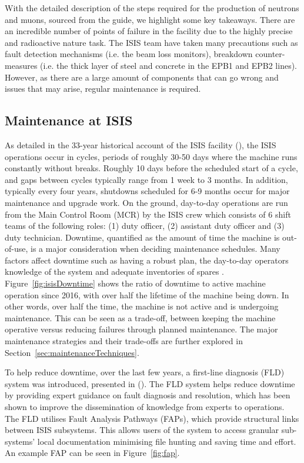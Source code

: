 \documentclass[10pt,oneside]{report}
\begin{document}
\noindent With the detailed description of the steps required for the production of neutrons and muons, sourced from the guide, we highlight some key takeaways. There are an incredible number of points of failure in the facility due to the highly precise and radioactive nature task. The ISIS team have taken many precautions such as fault detection mechanisms (i.e. the beam loss monitors), breakdown counter-measures (i.e. the thick layer of steel and concrete in the EPB1 and EPB2 lines). However, as there are a large amount of components that can go wrong and issues that may arise, regular maintenance is required. 

\subsection{Maintenance at ISIS} 
As detailed in the 33-year historical account of the ISIS facility (\citet{thomason2019isis}), the ISIS operations occur in cycles, periods of roughly 30-50 days where the machine runs constantly without breaks. Roughly 10 days before the scheduled start of a cycle, and gaps between cycles typically range from 1 week to 3 months. In addition, typically every four years, shutdowns scheduled for 6-9 months occur for major maintenance and upgrade work. On the ground, day-to-day operations are run from the Main Control Room (MCR) by the ISIS crew which consists of 6 shift teams of the following roles: (1) duty officer, (2) assistant duty officer and (3) duty technician.  Downtime, quantified as the amount of time the machine is out-of-use, is a major consideration when deciding maintenance schedules. Many factors affect downtime such as having a robust plan, the day-to-day operators knowledge of the system and adequate inventories of spares \cite{thomason2019isis}. Figure~\ref{fig:isisDowntime} shows the ratio of downtime to active machine operation since 2016, with over half the lifetime of the machine being down. In other words, over half the time, the machine is not active and is undergoing maintenance. This can be seen as a trade-off, between keeping the machine operative versus reducing failures through planned maintenance. The major maintenance strategies and their trade-offs are further explored in Section~\ref{sec:maintenanceTechniques}.

To help reduce downtime, over the last few years, a first-line diagnosis (FLD) system was introduced, presented in (\citet{fld2017}). The FLD system helps reduce downtime by providing expert guidance on fault diagnosis and resolution, which has been shown to improve the dissemination of knowledge from experts to operations. The FLD utilises Fault Analysis Pathways (FAPs), which provide structural links between ISIS subsystems. This allows users of the system to access granular sub-systems' local documentation minimising file hunting and saving time and effort. An example FAP can be seen in Figure~\ref{fig:fap}. 
\end{document}
